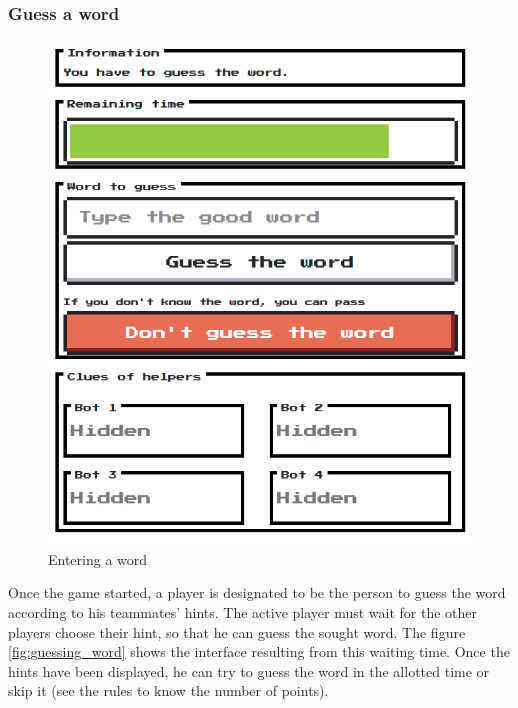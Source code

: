 \documentclass{tnreport}
\begin{document}
\bigskip

\subsubsection{Guess a word}

\begin{figure}
	\centering
	\vspace*{-1cm}
	\includegraphics[scale=0.4]{figures/guessing_word}
	\vspace*{-0.1cm}
	\caption{Entering a word}
	\label{fig:entering_word}
\end{figure}

Once the game started, a player is designated to be the person to guess the word according to his teammates' hints. The active player must wait for the other players choose their hint, so that he can guess the sought word. The figure \ref{fig:guessing_word} shows the interface resulting from this waiting time. Once the hints have been displayed, he can try to guess the word in the allotted time or skip it (see the rules to know the number of points). 
\end{document}
